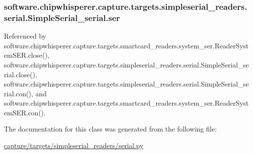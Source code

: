 \subsubsection[{ser}]{\setlength{\rightskip}{0pt plus 5cm}software.\+chipwhisperer.\+capture.\+targets.\+simpleserial\+\_\+readers.\+serial.\+Simple\+Serial\+\_\+serial.\+ser}\label{classsoftware_1_1chipwhisperer_1_1capture_1_1targets_1_1simpleserial__readers_1_1serial_1_1SimpleSerial__serial_afc12ce094b167d327f0fb8768c86ffe5}


Referenced by software.\+chipwhisperer.\+capture.\+targets.\+smartcard\+\_\+readers.\+system\+\_\+ser.\+Reader\+System\+S\+E\+R.\+close(), software.\+chipwhisperer.\+capture.\+targets.\+simpleserial\+\_\+readers.\+serial.\+Simple\+Serial\+\_\+serial.\+close(), software.\+chipwhisperer.\+capture.\+targets.\+simpleserial\+\_\+readers.\+serial.\+Simple\+Serial\+\_\+serial.\+con(), and software.\+chipwhisperer.\+capture.\+targets.\+smartcard\+\_\+readers.\+system\+\_\+ser.\+Reader\+System\+S\+E\+R.\+con().



The documentation for this class was generated from the following file\+:\begin{DoxyCompactItemize}
\item 
\hyperlink{capture_2targets_2simpleserial__readers_2serial_8py}{capture/targets/simpleserial\+\_\+readers/serial.\+py}\end{DoxyCompactItemize}
